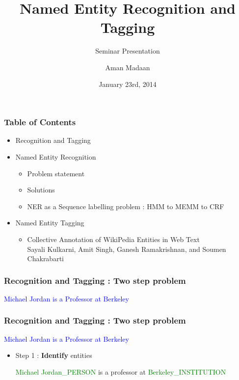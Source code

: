 \documentclass{beamer}
\title{Named Entity Recognition and Tagging}
\subtitle{Seminar Presentation}
\author[A. Madaan]{Aman Madaan}
\institute[IITB]{
  Indian Institute of Technology Bombay, Mumbai
}
\date{January 23rd, 2014}
\begin{document}
\maketitle

\begin{frame}
\frametitle{Table of Contents}
\tableofcontents[currentsection]
\begin{itemize}
  \item Recognition and Tagging \bigskip
  \item Named Entity Recognition \bigskip
    \begin{itemize}
      \item Problem statement \bigskip
      \item Solutions \bigskip
      \item NER as a Sequence labelling problem : HMM to MEMM to CRF
    \end{itemize}
\bigskip
  \item Named Entity Tagging \bigskip
    \begin{itemize}
      \item 
      Collective Annotation of WikiPedia Entities in Web Text \\ Sayali Kulkarni, Amit Singh, Ganesh Ramakrishnan, and Soumen Chakrabarti
    \end{itemize}
\end{itemize}
\end{frame}

\begin{frame}
 \frametitle{Recognition and Tagging : Two step problem}
 \begin{center}
\textcolor{blue}{Michael Jordan is a Professor at Berkeley}
   \end{center}

\end{frame}

\begin{frame}
 \frametitle{Recognition and Tagging : Two step problem}
 \begin{center}
\textcolor{blue}{Michael Jordan is a Professor at Berkeley}
   \end{center}

 \begin{itemize}  
  \item Step 1 : \textbf{Identify} entities

  \medskip
  \textcolor{green}{Michael Jordan\_PERSON} is a professor at \textcolor{green}{Berkeley\_INSTITUTION} \medskip
  
\end{itemize}
\end{frame}
\end{document}
